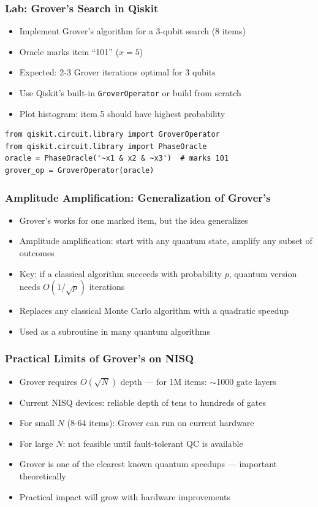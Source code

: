 \begin{frame}[fragile]\frametitle{Lab: Grover's Search in Qiskit}
\begin{itemize}
\item Implement Grover's algorithm for a 3-qubit search (8 items)
\item Oracle marks item ``101'' ($x=5$)
\item Expected: 2-3 Grover iterations optimal for 3 qubits
\item Use Qiskit's built-in \texttt{GroverOperator} or build from scratch
\item Plot histogram: item 5 should have highest probability
\end{itemize}
\begin{verbatim}
from qiskit.circuit.library import GroverOperator
from qiskit.circuit.library import PhaseOracle
oracle = PhaseOracle('~x1 & x2 & ~x3')  # marks 101
grover_op = GroverOperator(oracle)
\end{verbatim}
\end{frame}

\begin{frame}[fragile]\frametitle{Amplitude Amplification: Generalization of Grover's}
\begin{itemize}
\item Grover's works for one marked item, but the idea generalizes
\item Amplitude amplification: start with any quantum state, amplify any subset of outcomes
\item Key: if a classical algorithm succeeds with probability $p$, quantum version needs $O(1/\sqrt{p})$ iterations
\item Replaces any classical Monte Carlo algorithm with a quadratic speedup
\item Used as a subroutine in many quantum algorithms
\end{itemize}
\end{frame}

\begin{frame}[fragile]\frametitle{Practical Limits of Grover's on NISQ}
\begin{itemize}
\item Grover requires $O(\sqrt{N})$ depth --- for 1M items: $\sim$1000 gate layers
\item Current NISQ devices: reliable depth of tens to hundreds of gates
\item For small $N$ (8-64 items): Grover can run on current hardware
\item For large $N$: not feasible until fault-tolerant QC is available
\item Grover is one of the clearest known quantum speedups --- important theoretically
\item Practical impact will grow with hardware improvements
\end{itemize}
\end{frame}

